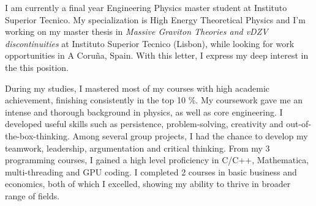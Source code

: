 \documentclass[10pt,stdletter,dateno,sigleft]{newlfm} %
\begin{document}
\begin{newlfm}



I am currently a final year Engineering Physics master student at Instituto Superior Tecnico. My specialization is High Energy Theoretical Physics and I'm working on my master thesis in \emph{Massive Graviton Theories and vDZV discontinuities} at Instituto Superior Tecnico (Lisbon), while looking for work opportunities in A Coruña, Spain. With this letter, I express my deep interest in the this position.






During my studies, I mastered most of my courses with high academic achievement, finishing consistently in the top 10 \%. My coursework gave me an intense and thorough background in physics, as well as core engineering. I developed useful skills such as persistence, problem-solving, creativity and out-of-the-box-thinking. Among several group projects, I had the chance to develop my teamwork, leadership, argumentation and critical thinking. From my 3 programming courses, I gained a high level proficiency in C/C++, Mathematica, multi-threading and GPU coding. I completed 2 courses in basic business and economics, both of which I excelled, showing my ability to thrive in broader range of fields.



\end{newlfm}
\end{document}
